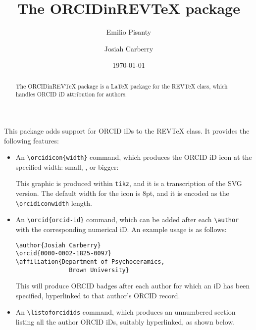 \documentclass[%
  reprint,
  aps,
  pra,
  superscriptaddress,
  a4paper,
]{revtex4-2}
\begin{document}
\title{The ORCIDinREVTeX package}

\author{Emilio Pisanty}

\author{Josiah Carberry}


\date{\today}

\begin{abstract}
The ORCIDinREVTeX package is a {\LaTeX} package for the REVTeX class, which handles ORCID iD attribution for authors.
\end{abstract}

\maketitle


This package adds support for ORCID iDs to the REVTeX class. It provides the following features:

\begin{itemize}
\item
An \verb|\orcidicon{width}| command, which produces the ORCID iD icon at the specified width: small, \orcidicon{8pt}, or bigger:

\orcidicon{50pt}

This graphic is produced within \texttt{tikz}, and it is a transcription of the SVG version.
The default width for the icon is 8pt, and it is encoded as the \verb|\orcidiconwidth| length.

\item
An \verb|\orcid{orcid-id}| command, which can be added after each \verb|\author| with the corresponding numerical iD. 
An example usage is as follows:
\begin{verbatim}
\author{Josiah Carberry}
\orcid{0000-0002-1825-0097}
\affiliation{Department of Psychoceramics, 
               Brown University}
\end{verbatim}
This will produce ORCID badges after each author for which an iD has been specified, hyperlinked to that author's ORCID record.


\item
An \verb|\listoforcidids| command, which produces an unnumbered section listing all the author ORCID iDs, suitably hyperlinked, as shown below.

\end{itemize}
\end{document}
